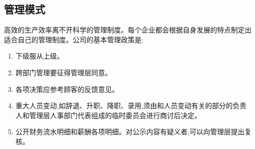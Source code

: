 \subsection{管理模式}
高效的生产效率离不开科学的管理制度。每个企业都会根据自身发展的特点制定出
适合自己的管理制度。公司的基本管理政策是:
\begin{enumerate}
\item 下级服从上级。
\item 跨部门管理要征得管理层同意。
\item 各项决策应参考顾客的反馈意见。
\item 重大人员变动,如辞退、升职、降职、录用,须由和人员变动有关的部分的负责
        人和管理层人事部门代表组成的临时委员会进行商讨后决定。
\item 公开财务流水明细和薪酬各项明细。对公示内容有疑义者,可以向管理层提出复
        核。
\end{enumerate}
